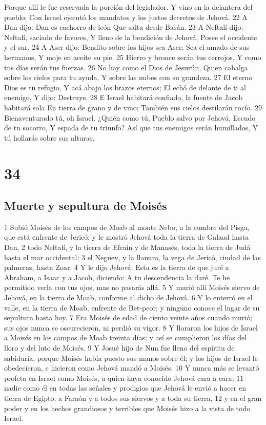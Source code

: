 Porque allí le fue reservada la porción del legislador.
Y vino en la delantera del pueblo;
Con Israel ejecutó los mandatos y los justos decretos de Jehová.
22 A Dan dijo:
Dan es cachorro de león
Que salta desde Basán.
23 A Neftalí dijo:
Neftalí, saciado de favores,
Y lleno de la bendición de Jehová,
Posee el occidente y el sur.
24 A Aser dijo:
Bendito sobre los hijos sea Aser;
Sea el amado de sus hermanos,
Y moje en aceite su pie.
25 Hierro y bronce serán tus cerrojos,
Y como tus días serán tus fuerzas.
26 No hay como el Dios de Jesurún,
Quien cabalga sobre los cielos para tu ayuda,
Y sobre las nubes con su grandeza.
27 El eterno Dios es tu refugio,
Y acá abajo los brazos eternos;
El echó de delante de ti al enemigo, 
Y dijo: Destruye.
28 E Israel habitará confiado, la fuente de Jacob habitará sola
En tierra de grano y de vino;
También sus cielos destilarán rocío.
29 Bienaventurado tú, oh Israel.
¿Quién como tú,
Pueblo salvo por Jehová,
Escudo de tu socorro,
Y espada de tu triunfo?
Así que tus enemigos serán humillados,
Y tú hollarás sobre sus alturas.

\chapter{34}

\section{Muerte y sepultura de Moisés}

1 Subió Moisés de los campos de Moab al monte Nebo, a la cumbre del Pisga, que está enfrente de Jericó; y le mostró Jehová toda la tierra de Galaad hasta Dan,
2 todo Neftalí, y la tierra de Efraín y de Manasés, toda la tierra de Judá hasta el mar occidental;
3 el Neguev, y la llanura, la vega de Jericó, ciudad de las palmeras, hasta Zoar.
4 Y le dijo Jehová: Esta es la tierra de que juré a Abraham, a Isaac y a Jacob, diciendo: A tu descendencia la daré. Te he permitido verla con tus ojos, mas no pasarás allá.
5 Y murió allí Moisés siervo de Jehová, en la tierra de Moab, conforme al dicho de Jehová.
6 Y lo enterró en el valle, en la tierra de Moab, enfrente de Bet-peor; y ninguno conoce el lugar de su sepultura hasta hoy.
7 Era Moisés de edad de ciento veinte años cuando murió; sus ojos nunca se oscurecieron, ni perdió su vigor.
8 Y lloraron los hijos de Israel a Moisés en los campos de Moab treinta días; y así se cumplieron los días del lloro y del luto de Moisés.
9 Y Josué hijo de Nun fue lleno del espíritu de sabiduría, porque Moisés había puesto sus manos sobre él; y los hijos de Israel le obedecieron, e hicieron como Jehová mandó a Moisés.
10 Y nunca más se levantó profeta en Israel como Moisés, a quien haya conocido Jehová cara a cara; 
11 nadie como él en todas las señales y prodigios que Jehová le envió a hacer en tierra de Egipto, a Faraón y a todos sus siervos y a toda su tierra,
12 y en el gran poder y en los hechos grandiosos y terribles que Moisés hizo a la vista de todo Israel.


